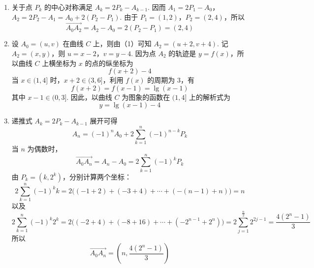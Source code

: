 \begin{solution}
\begin{enumerate}
\item 关于点 \(P_k\) 的中心对称满足 \(A_k=2P_k-A_{k-1}\). 因而 \(A_1=2P_1-A_0\)，\(A_2=2P_2-A_1=A_0+2(P_2-P_1)\).
由于 \(P_1=(1,2)\)，\(P_2=(2,4)\)，所以
\[
\overrightarrow{A_0A_2}=A_2-A_0=2(P_2-P_1)=(2,4)
\]

\item 设 \(A_0=(u,v)\) 在曲线 \(C\) 上，则由（1）可知 \(A_2=(u+2,v+4)\). 记 \(A_2=(x,y)\)，则 \(u=x-2\)，\(v=y-4\).
因为点 \(A_2\) 的轨迹是 \(y=f(x)\)，所以曲线 \(C\) 上横坐标为 \(x\) 的点的纵坐标为
\[
f(x+2)-4
\]
当 \(x\in(1,4]\) 时，\(x+2\in(3,6]\)，利用 \(f(x)\) 的周期为 \(3\)，有
\[
f(x+2)=f(x-1)=\lg(x-1)
\]
其中 \(x-1\in(0,3]\). 因此，以曲线 \(C\) 为图象的函数在 \((1,4]\) 上的解析式为
\[
y=\lg(x-1)-4
\]

\item 递推式 \(A_k=2P_k-A_{k-1}\) 展开可得
\[
A_n=(-1)^nA_0+2\sum_{k=1}^{n}(-1)^{n-k}P_k
\]
当 \(n\) 为偶数时，
\[
\overrightarrow{A_0A_n}=A_n-A_0=2\sum_{k=1}^{n}(-1)^kP_k
\]
由 \(P_k=(k,2^k)\)，分别计算两个坐标：
\[
2\sum_{k=1}^{n}(-1)^k k
=2\bigl((-1+2)+(-3+4)+\cdots+(-(n-1)+n)\bigr)=n
\]
以及
\[
2\sum_{k=1}^{n}(-1)^k2^k
=2\bigl((-2+4)+(-8+16)+\cdots+(-2^{n-1}+2^n)\bigr)
=2\sum_{j=1}^{\frac{n}{2}}2^{2j-1}
=\frac{4(2^n-1)}{3}
\]
所以
\[
\overrightarrow{A_0A_n}=\left(n,\frac{4(2^n-1)}{3}\right)
\]
\end{enumerate}
\end{solution}
